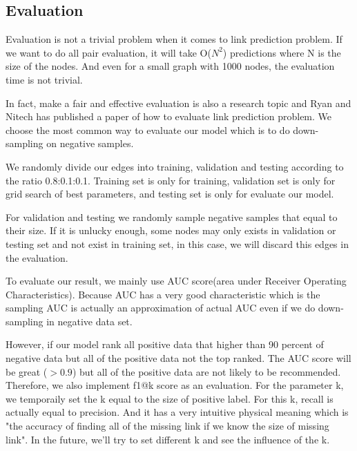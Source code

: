 \documentclass[12pt]{article}
\begin{document}
\subsection{Evaluation}
Evaluation is not a trivial problem when it comes to link prediction problem. If we want to do all pair evaluation, it will take O($N^2$) predictions where N is the size of the nodes. And even for a small graph with 1000 nodes, the evaluation time is not trivial.
 
In fact, make a fair and effective evaluation is also a research topic and Ryan and Nitech has published a paper of how to evaluate link prediction problem. We choose the most common way to evaluate our model which is to do down-sampling on negative samples. 

We randomly divide our edges into training, validation and testing according to the ratio 0.8:0.1:0.1. Training set is only for training, validation set is only for grid search of best parameters, and testing set is only for evaluate our model.

For validation and testing we randomly sample negative samples that equal to their size. If it is unlucky enough, some nodes may only exists in validation or testing set and not exist in training set, in this case, we will discard this edges in the evaluation.

To evaluate our result, we mainly use AUC score(area under Receiver Operating Characteristics). Because AUC has a very good characteristic which is the sampling AUC is actually an approximation of actual AUC even if we do down-sampling in negative data set. 

However, if our model rank all positive data that higher than 90 percent of negative data but all of the positive data not the top ranked. The AUC score will be great ($>0.9$) but all of the positive data are not likely to be recommended. Therefore, we also implement f1@k score as an evaluation. For the parameter k, we temporaily set the k equal to the size of positive label. For this k, recall is actually equal to precision. And it has a very intuitive physical meaning which is "the accuracy of finding all of the missing link if we know the size of missing link". In the future, we'll try to set different k and see the influence of the k. 
\end{document}
